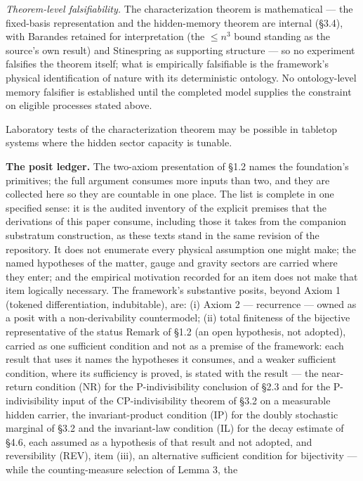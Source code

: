 \documentclass[
]{article}
\begin{document}
\emph{Theorem-level falsifiability.} The characterization theorem is
mathematical --- the fixed-basis representation and the hidden-memory
theorem are internal (§3.4), with Barandes retained for interpretation
(the \(\leq n^3\) bound standing as the source's own result) and
Stinespring as supporting structure --- so no experiment falsifies the
theorem itself; what is empirically falsifiable is the framework's
physical identification of nature with its deterministic ontology. No
ontology-level memory falsifier is established until the completed model
supplies the constraint on eligible processes stated above.

Laboratory tests of the characterization theorem may be possible in
tabletop systems where the hidden sector capacity is tunable.

\textbf{The posit ledger.} The two-axiom presentation of §1.2 names the
foundation's primitives; the full argument consumes more inputs than
two, and they are collected here so they are countable in one place. The
list is complete in one specified sense: it is the audited inventory of
the explicit premises that the derivations of this paper consume,
including those it takes from the companion substratum construction, as
these texts stand in the same revision of the repository. It does not
enumerate every physical assumption one might make; the named hypotheses
of the matter, gauge and gravity sectors are carried where they enter;
and the empirical motivation recorded for an item does not make that
item logically necessary. The framework's substantive posits, beyond
Axiom 1 (tokened differentiation, indubitable), are: (i) Axiom 2 ---
recurrence --- owned as a posit with a non-derivability countermodel;
(ii) total finiteness of the bijective representative of the status
Remark of §1.2 (an open hypothesis, not adopted), carried as one
sufficient condition and not as a premise of the framework: each result
that uses it names the hypotheses it consumes, and a weaker sufficient
condition, where its sufficiency is proved, is stated with the result
--- the near-return condition (NR) for the P-indivisibility conclusion
of §2.3 and for the P-indivisibility input of the CP-indivisibility
theorem of §3.2 on a measurable hidden carrier, the invariant-product
condition (IP) for the doubly stochastic marginal of §3.2 and the
invariant-law condition (IL) for the decay estimate of §4.6, each
assumed as a hypothesis of that result and not adopted, and
reversibility (REV), item (iii), an alternative sufficient condition for
bijectivity --- while the counting-measure selection of Lemma 3, the
\end{document}
